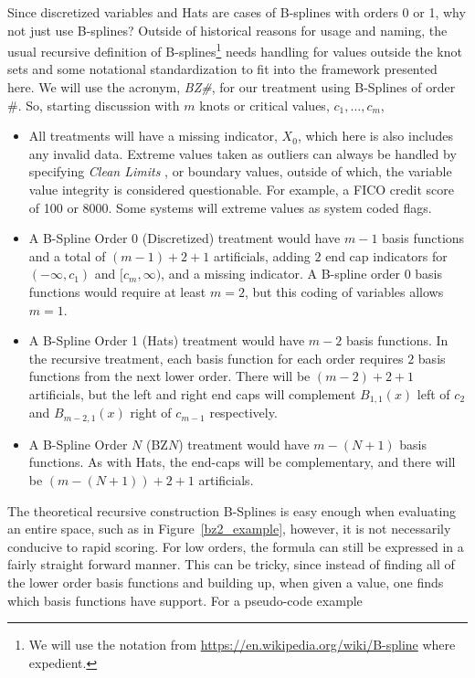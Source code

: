 \documentclass[10pt]{article}
\begin{document}
Since discretized variables and Hats are cases of B-splines with orders 0 or 1, why not just use B-splines?  Outside of historical
reasons for usage and naming, the usual recursive definition of B-splines\footnote{We will use the notation from
\url{https://en.wikipedia.org/wiki/B-spline} where expedient.}
needs handling for values outside the knot sets and some notational standardization to fit into the framework presented here.
We will use the acronym, {\em BZ\#}, for our treatment using B-Splines of order \#.
So, starting discussion with $m$ knots or critical values, $c_1, \ldots, c_m$,
\begin{itemize}
    \item All treatments will have a missing indicator, $X_0$, which here is also includes any invalid data.  Extreme values
        taken as outliers can always be handled by specifying {\em Clean Limits }, or boundary values, outside of which, the
        variable value integrity is considered questionable.  For example, a FICO credit score of 100 or 8000.  Some systems
        will extreme values as system coded flags.
    \item A B-Spline Order 0 (Discretized) treatment would have $m-1$ basis functions and a total of $(m-1)+2+1$ artificials,
        adding $2$ end cap 
        indicators for $(-\infty, c_1)$ and $[c_m, \infty)$, and a missing indicator.  A B-spline order 0 basis functions 
        would require at least $m=2$, but this coding of variables allows $m=1$.
    \item A B-Spline Order 1 (Hats) treatment would have $m-2$ basis functions.  In the recursive treatment, each basis
        function for each order requires $2$ basis functions from the next lower order.  There will be $(m-2)+2+1$ artificials,
        but the left and right end caps will complement $B_{1,1}(x)$ left of $c_2$ and $B_{m-2,1}(x)$ right of $c_{m-1}$ respectively.
    \item A B-Spline Order $N$ (BZ$N$) treatment would have $m-(N+1)$ basis functions. As with Hats, the end-caps will be complementary,
        and there will be $(m-(N+1))+2+1$ artificials.
\end{itemize}
The theoretical recursive construction B-Splines is easy enough when evaluating an entire space, such as in Figure~\ref{bz2_example}, 
however, it is not necessarily conducive to rapid scoring. For low orders, the 
formula can still be expressed in a fairly straight forward manner. This can be tricky, since instead of finding all of the
lower order basis functions and building up, when given a value, one finds which basis functions have support.  For a pseudo-code example
\end{document}
